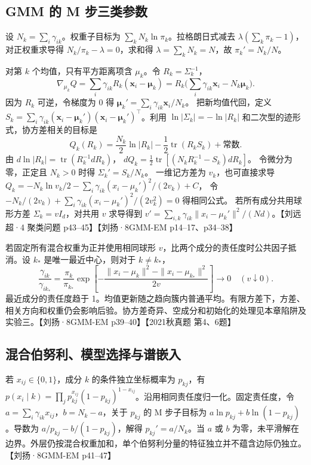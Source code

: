 \documentclass[UTF8,a4paper,zihao=-4,fontset=fandol]{ctexrep}
\begin{document}
\subsection{GMM 的 M 步三类参数}
设 $N_k=\sum_i\gamma_{ik}$。权重子目标为 $\sum_k N_k\ln\pi_k$。拉格朗日式减去 $\lambda(\sum_k\pi_k-1)$，对正权重求导得 $N_k/\pi_k-\lambda=0$，求和得 $\lambda=\sum_kN_k=N$，故 $\pi_k'=N_k/N$。

对第 $k$ 个均值，只有平方距离项含 $\mu_k$。令 $R_k=\Sigma_k^{-1}$，
\[
\nabla_{\mu_k}Q=\sum_i\gamma_{ik}R_k(\bm x_i-\bm\mu_k)
=R_k\Big(\sum_i\gamma_{ik}\bm x_i-N_k\bm\mu_k\Big).
\]
因为 $R_k$ 可逆，令梯度为 0 得 $\bm\mu_k'=\sum_i\gamma_{ik}\bm x_i/N_k$。
把新均值代回，定义 $S_k=\sum_i\gamma_{ik}(\bm x_i-\bm\mu_k')(\bm x_i-\bm\mu_k')^\top$。利用 $\ln|\Sigma_k|=-\ln|R_k|$ 和二次型的迹形式，协方差相关的目标是
\[
Q_k(R_k)=\frac{N_k}{2}\ln|R_k|-\frac12\operatorname{tr}(R_k S_k)+\text{常数}.
\]
由 $d\ln|R_k|=\operatorname{tr}(R_k^{-1}dR_k)$，
$dQ_k=\frac12\operatorname{tr}[(N_kR_k^{-1}-S_k)dR_k]$。
令微分为零，正定且 $N_k>0$ 时得 $\Sigma_k'=S_k/N_k$。
一维记方差为 $v_k$，也可直接求导
$Q_k=-N_k\ln v_k/2-\sum_i\gamma_{ik}(x_i-\mu_k')^2/(2v_k)+C$，
令 $-N_k/(2v_k)+\sum_i\gamma_{ik}(x_i-\mu_k')^2/(2v_k^2)=0$ 得相同公式。
若所有成分共用球形方差 $\Sigma_k=vI_d$，对共用 $v$ 求导得到 $v'=\sum_{i,k}\gamma_{ik}\|x_i-\mu_k'\|^2/(Nd)$。【刘远超·4 聚类问题 p43–45】【刘扬·8GMM-EM p14–17、p34–38】

若固定所有混合权重为正并使用相同球形 $v$，比两个成分的责任度时公共因子抵消。设 $k_*$ 是唯一最近中心，则对于 $k\ne k_*$，
\[
\frac{\gamma_{ik}}{\gamma_{i k_*}}=\frac{\pi_k}{\pi_{k_*}}
\exp\!\left[-\frac{\|x_i-\mu_k\|^2-\|x_i-\mu_{k_*}\|^2}{2v}\right]\longrightarrow0
\quad (v\downarrow0).
\]
最近成分的责任度趋于 1。均值更新随之趋向簇内普通平均。有限方差下，方差、相关方向和权重仍会影响后验。协方差奇异、空成分和初始化的处理见本章陷阱及实验三。【刘扬·8GMM-EM p39–40】【2021秋真题 第4、6题】

\subsection{混合伯努利、模型选择与谱嵌入}
若 $x_{ij}\in\{0,1\}$，成分 $k$ 的条件独立坐标概率为 $p_{kj}$，有
$p(x_i\mid k)=\prod_j p_{kj}^{x_{ij}}(1-p_{kj})^{1-x_{ij}}$。沿用相同责任度归一化。固定责任度，令 $a=\sum_i\gamma_{ik}x_{ij}$，$b=N_k-a$，关于 $p_{kj}$ 的 M 步子目标为 $a\ln p_{kj}+b\ln(1-p_{kj})$。导数为 $a/p_{kj}-b/(1-p_{kj})$，解得 $p_{kj}'=a/N_k$。当 $a$ 或 $b$ 为零，未平滑解在边界。外层仍按混合权重加和，单个伯努利分量的特征独立并不蕴含边际仍独立。【刘扬·8GMM-EM p41–47】
\end{document}
